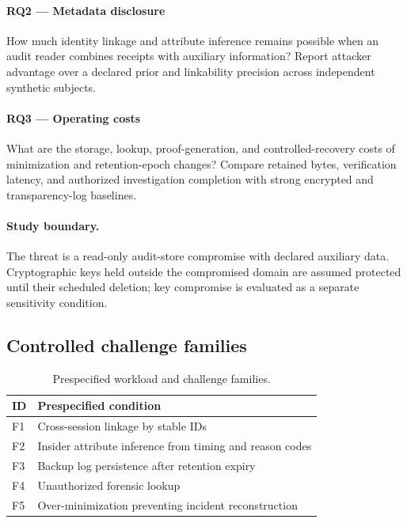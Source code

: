 \documentclass[11pt,a4paper]{article}
\begin{document}
\paragraph{RQ2 — Metadata disclosure} How much identity linkage and attribute inference remains possible when an audit reader combines receipts with auxiliary information? Report attacker advantage over a declared prior and linkability precision across independent synthetic subjects.

\paragraph{RQ3 — Operating costs} What are the storage, lookup, proof-generation, and controlled-recovery costs of minimization and retention-epoch changes? Compare retained bytes, verification latency, and authorized investigation completion with strong encrypted and transparency-log baselines.

\paragraph{Study boundary.} The threat is a read-only audit-store compromise with declared auxiliary data. Cryptographic keys held outside the compromised domain are assumed protected until their scheduled deletion; key compromise is evaluated as a separate sensitivity condition.

\subsection{Controlled challenge families}
\begin{table}[ht]
\centering\small
\caption{Prespecified workload and challenge families.}
\begin{tabularx}{\linewidth}{@{}lX@{}}\toprule
ID & Prespecified condition \\ \midrule
F1 & Cross-session linkage by stable IDs \\ 
F2 & Insider attribute inference from timing and reason codes \\ 
F3 & Backup log persistence after retention expiry \\ 
F4 & Unauthorized forensic lookup \\ 
F5 & Over-minimization preventing incident reconstruction \\ 
\bottomrule\end{tabularx}\end{table}
\end{document}
